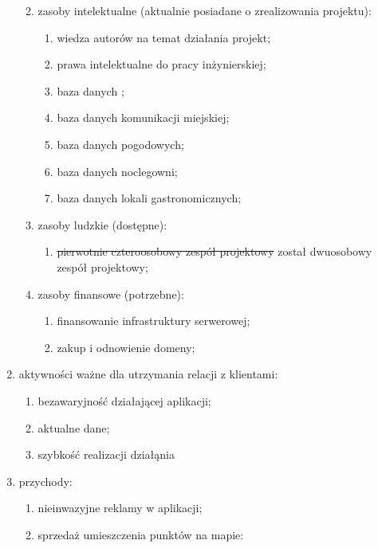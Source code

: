 \begin{enumerate}[label=\Roman*.]
\begin{enumerate}[label=\alph*.]
\begin{enumerate}[label=\roman*.]
        \end{enumerate}
        \item zasoby intelektualne (aktualnie posiadane o zrealizowania projektu):
        \begin{enumerate}[label=\roman*.]
            \item wiedza autorów na temat działania projekt;
            \item prawa intelektualne do pracy inżynierskiej;
            \item baza danych ;
            \item baza danych komunikacji miejskiej;
            \item baza danych pogodowych;
            \item baza danych noclegowni;
            \item baza danych lokali gastronomicznych;
        \end{enumerate}
        \item zasoby ludzkie (dostępne):
        \begin{enumerate}[label=\roman*.]
            \item \sout{pierwotnie czteroosobowy zespół projektowy} został dwuosobowy zespół projektowy;
        \end{enumerate}
        \item zasoby finansowe (potrzebne):
        \begin{enumerate}[label=\roman*.]
            \item finansowanie infrastruktury serwerowej;
            \item zakup i odnowienie domeny;
        \end{enumerate}
    \end{enumerate}
    \item aktywności ważne dla utrzymania relacji z klientami:
    \begin{enumerate}[label=\alph*.]
        \item bezawaryjność działającej aplikacji;
        \item aktualne dane;
        \item szybkość realizacji działąnia
    \end{enumerate}
    \item przychody:
    \begin{enumerate}[label=\alph*.]
        \item nieinwazyjne reklamy w aplikacji;
        \item sprzedaż umieszczenia punktów na mapie:

\end{enumerate}
\end{enumerate}

